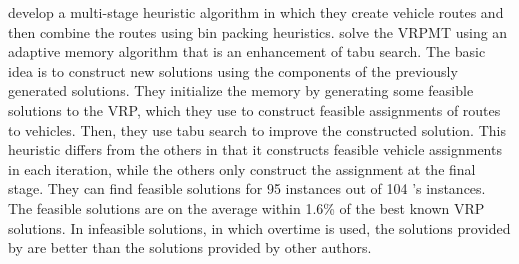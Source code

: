 \citet{Petch} develop a multi-stage heuristic algorithm in which they 
create vehicle routes and then combine the routes using bin packing 
heuristics. \citet{Olivera} solve the VRPMT using an adaptive memory 
algorithm that is an enhancement of tabu search. The basic idea is to 
construct new solutions using the components of the previously generated 
solutions. They initialize the memory by generating some feasible 
solutions to the VRP, which they use to construct feasible assignments 
of routes to vehicles. Then, they use tabu search to improve the 
constructed solution. This heuristic differs from the others in that 
it constructs feasible vehicle assignments in each iteration, 
while the others only construct the assignment at the final stage. 
They can find feasible solutions for 95  instances out of 
104 \citet{Taillard}'s instances. The feasible solutions are on the 
average within 1.6\% of the best known VRP solutions. In infeasible 
solutions, in which overtime is used, the solutions provided by 
\citet{Olivera} are better than the solutions provided by other authors.      






